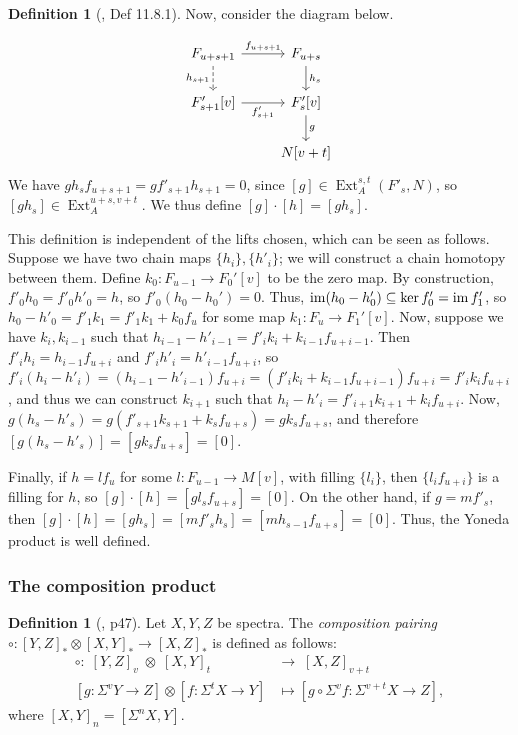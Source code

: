 \documentclass[11pt, titlepage]{article} %
\def\subq{\ensuremath\subseteq}
\DeclareMathOperator{\Ext}{Ext}
\DeclareMathOperator{\im}{im}
\numberwithin{equation}{subsection}
\theoremstyle{plain}
\theoremstyle{definition}
\newtheorem{definition}[theorem]{Definition}
\begin{document}
\begin{definition}[\autocite{rognes2}, Def 11.8.1]
Now, consider the diagram below.

\[\begin{tikzcd}
F_{u+s+1} \arrow[r, "f_{u+s+1}"] \arrow[d, swap, "h_{s+1}", dashrightarrow]  & F_{u+s} \arrow[d, "h_{s}"]  \\
F'_{s+1}[v] \arrow[r, swap, "f'_{s+1}"]  & F'_{s}[v] \arrow[d, "g"]\\
& N[v+t]
\end{tikzcd}\]
We have \(gh_sf_{u+s+1}=gf'_{s+1}h_{s+1}=0\), since \([g] \in \Ext_A^{s,t}(F'_s, N)\), so \([gh_s]\in \Ext_A^{u+s, v+t}\). We thus define \([g]\cdot  [h]=[gh_s]\). 
\end{definition}

This definition is independent of the lifts chosen, which can be seen as follows. Suppose we have two chain maps \(\{h_i\}, \{h'_i\}\); we will construct a chain homotopy between them. Define \(k_0 : F_{u-1}\to F_0'[v]\) to be the zero map. By construction, \(f'_0h_0=f'_0h'_0=h\), so \(f'_0(h_0-h_0')=0\). Thus, \(\im(h_0-h'_0)\subq \ker f'_0=\im f'_1\), so \(h_0-h'_0=f'_1k_1=f'_1k_1+k_0f_{u}\) for some map \(k_1 : F_u \to F_1'[v]\). Now, suppose we have \(k_i, k_{i-1}\) such that \(h_{i-1}-h'_{i-1} = f'_{i}k_i+k_{i-1}f_{u+i-1}\). Then \(f'_ih_i=h_{i-1}f_{u+i}\) and \(f'_ih'_i=h'_{i-1}f_{u+i}\), so \(f'_i(h_i-h'_i)=(h_{i-1}-h'_{i-1})f_{u+i}=(f'_{i}k_i+k_{i-1}f_{u+i-1})f_{u+i}=f'_ik_if_{u+i}\), and thus we can construct \(k_{i+1}\) such that \(h_i-h'_i=f'_{i+1}k_{i+1}+k_if_{u+i}\). Now, \(g(h_s-h'_s)=g(f'_{s+1}k_{s+1}+k_sf_{u+s})=gk_sf_{u+s}\), and therefore \([g(h_s-h'_s)]=[gk_sf_{u+s}]=[0]\).

Finally, if \(h=lf_u\) for some \(l : F_{u-1}\to M[v]\), with filling \(\{l_i\}\), then \(\{l_if_{u+i}\}\) is a filling for \(h\), so \([g]\cdot [h]=[gl_sf_{u+s}]=[0]\). On the other hand, if \(g=mf'_{s}\), then \([g]\cdot[h]=[gh_s]=[mf'_sh_s]=[mh_{s-1}f_{u+s}]=[0]\). Thus, the Yoneda product is well defined.

\subsubsection{The composition product}

\begin{definition}[{\autocite{ass}, p47}]
Let \(X, Y, Z\) be spectra. The \textit{composition pairing} \(\circ : [Y, Z]_* \otimes [X,Y]_* \to [X,Z]_*\) is defined as follows: 
\begin{align*}
\circ :\; [Y, Z]_v\; \otimes \;[X,Y]_t\; &\to\; [X,Z]_{v+t}\\
[g : \Sigma^v Y \to Z]\otimes [f : \Sigma^t X\to Y] &\mapsto [g \circ \Sigma^v f : \Sigma^{v+t}X\to Z],
\end{align*}
where \([X,Y]_n=[\Sigma^n X, Y]\).
\end{definition}
\end{document}
